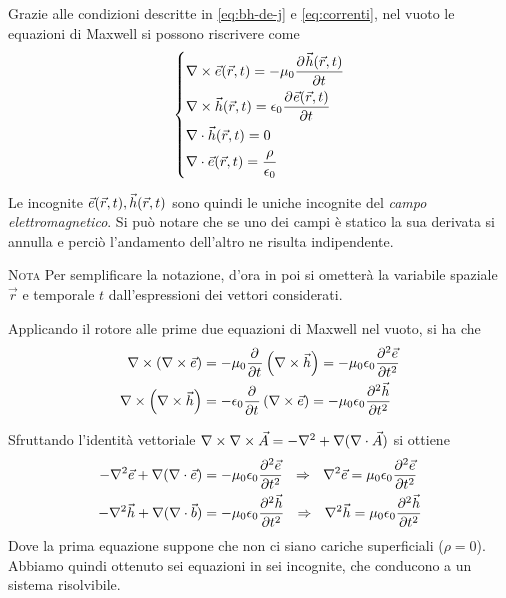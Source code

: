 Grazie alle condizioni descritte in \eqref{eq:bh-de-j} e \eqref{eq:correnti}, nel vuoto
le equazioni di Maxwell si possono riscrivere come
\begin{equation}\begin{dcases}
	\rot \ert = -\mu_0 \deriv{\hrt}{t} \\
	\rot \hrt = \epsilon_0 \deriv{\ert}{t}\\
	\diverg \hrt = 0 \\ \diverg\ert = \frac{\rho}{\epsilon_0}
\end{dcases}\label{eq:maxwell-vuoto}\end{equation}

Le incognite $\ert, \hrt$ sono quindi le uniche incognite del \emph{campo elettromagnetico}.
Si può notare che se uno dei campi è statico la sua derivata si annulla e perciò l'andamento dell'altro ne risulta indipendente.

\smallbreak
\textsc{Nota } Per semplificare la notazione, d'ora in poi si ometterà la variabile spaziale $\vec{r}$ e temporale $t$ dall'espressioni dei vettori considerati.
\smallbreak

Applicando il rotore alle prime due equazioni di Maxwell nel vuoto, si ha che
\begin{equation}\begin{split}
	\rot\left(\rot\e\right) &= -\mu_0 \deriv{}{t} \left(\rot\h\right) = -\mu_0\epsilon_0 \deriv[2]{\e}{t} \\
	\rot\left(\rot\h\right) &= -\epsilon_0 \deriv{}{t} \left(\rot\e\right) = -\mu_0\epsilon_0 \deriv[2]{\h}{t} \\
\end{split}\end{equation}

Sfruttando l'identità vettoriale $\rot\rot\vec{A} = -\nabla^2 + \nabla(\diverg\vec{A})$ si ottiene
\begin{equation}\begin{split}
	-\nabla^2\e + \nabla(\diverg\e) &= - \mu_0\epsilon_0 \deriv[2]{\e}{t} ~~ \Rightarrow ~~ \nabla^2\e = \mu_0\epsilon_0\deriv[2]{\e}{t}\\
	-\nabla^2\h + \nabla(\diverg\b) &= - \mu_0\epsilon_0 \deriv[2]{\h}{t} ~~ \Rightarrow ~~ \nabla^2\h = \mu_0\epsilon_0\deriv[2]{\h}{t}\\
\end{split}\end{equation}
Dove la prima equazione suppone che non ci siano cariche superficiali ($\rho=0$).
Abbiamo quindi ottenuto sei equazioni in sei incognite, che conducono a un sistema risolvibile.

